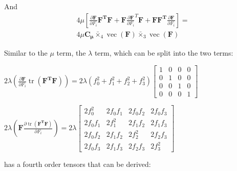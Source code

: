 \documentclass[twocolumn,10pt]{asme2ej}
\DeclareMathOperator{\vect}{vec}
\DeclareMathOperator{\tr}{tr}
\begin{document}
And
\begin{equation}
\begin{split}
4\mu\left[\frac{\partial \bm{F}}{\partial F_i}\bm{F^TF} + \bm{F}\frac{\partial \bm{F}}{\partial F_i}^T\bm{F} + \bm{FF^T}\frac{\partial \bm{F}}{\partial F_i}\right] =
\\ 4\mu \bm{C_{\mu}} \bar{\times}_4 \vect (\bm{F}) \bar{\times}_3 \vect (\bm{F})
\end{split}
\end{equation}

Similar to the $\mu$ term, the $\lambda$ term, which can be split into the two terms:

\begin{center}
  $2\lambda \left(\frac{\partial \bm{F}}{\partial F_i}\tr \left(\bm{F^TF}\right) \right)  = 2\lambda \left(f_{0}^2 + f_{1}^2 + f_{2}^2  + f_{3}^2\right) \begin{bmatrix}
  1 & 0 & 0 & 0  \\
  0 & 1  & 0 & 0 \\
  0 & 0 & 1  & 0 \\
  0 & 0 & 0 & 1  \end{bmatrix}$

  \bigskip
  $2\lambda \left(\bm{F}\frac{\partial \tr \left(\bm{F^TF}\right)}{\partial F_i}\right)  = 2\lambda \begin{bmatrix}
  2f_{0}^2 & 2f_0f_1 & 2f_0f_2 & 2f_0f_3  \\
  2f_0f_1 & 2f_{1}^2 & 2f_1f_2 & 2f_1f_3 \\
  2f_0f_2 & 2f_1f_2 & 2f_{2}^2 & 2f_2f_3 \\
  2f_0f_3 & 2f_1f_3 & 2f_2f_3 & 2f_{3}^2  \end{bmatrix}$
\end{center}

has a fourth order tensors that can be derived:
\end{document}
